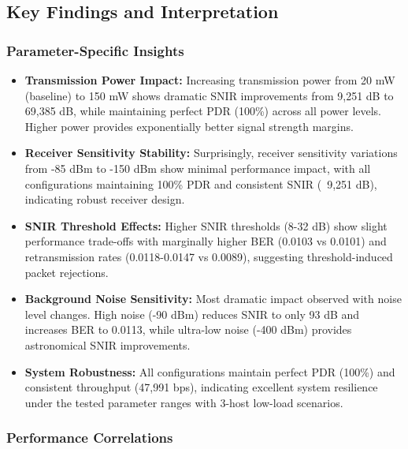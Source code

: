 \documentclass{article}
\begin{document}
\subsection{Key Findings and Interpretation}

\subsubsection{Parameter-Specific Insights}

\begin{itemize}

  \item \textbf{Transmission Power Impact:} Increasing transmission power from 20 mW (baseline) to 150 mW shows dramatic SNIR improvements from 9,251 dB to 69,385 dB, while maintaining perfect PDR (100\%) across all power levels. Higher power provides exponentially better signal strength margins.

  

  \item \textbf{Receiver Sensitivity Stability:} Surprisingly, receiver sensitivity variations from -85 dBm to -150 dBm show minimal performance impact, with all configurations maintaining 100\% PDR and consistent SNIR (~9,251 dB), indicating robust receiver design.

  

  \item \textbf{SNIR Threshold Effects:} Higher SNIR thresholds (8-32 dB) show slight performance trade-offs with marginally higher BER (0.0103 vs 0.0101) and retransmission rates (0.0118-0.0147 vs 0.0089), suggesting threshold-induced packet rejections.

  

  \item \textbf{Background Noise Sensitivity:} Most dramatic impact observed with noise level changes. High noise (-90 dBm) reduces SNIR to only 93 dB and increases BER to 0.0113, while ultra-low noise (-400 dBm) provides astronomical SNIR improvements.

  

  \item \textbf{System Robustness:} All configurations maintain perfect PDR (100\%) and consistent throughput (47,991 bps), indicating excellent system resilience under the tested parameter ranges with 3-host low-load scenarios.

\end{itemize}

\subsubsection{Performance Correlations}
\end{document}
